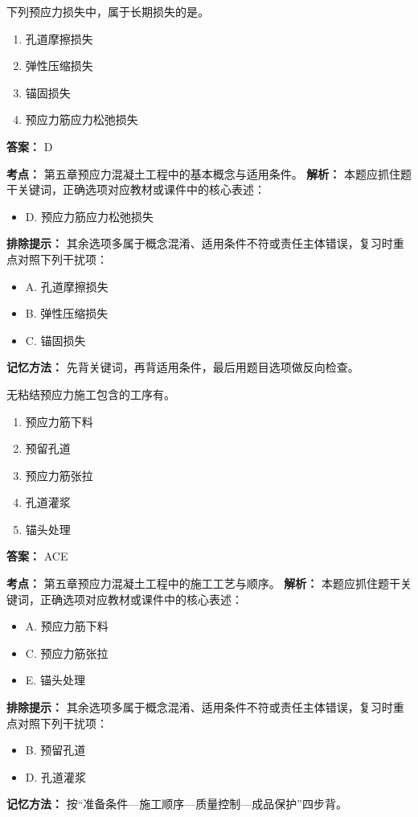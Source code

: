 \documentclass[UTF8,fontset=fandol,11pt]{ctexart}
\begin{document}
\begin{quizbox}[title={第 6 题}]
下列预应力损失中，属于长期损失的是。\\
\begin{enumerate}[label=\Alph*.]
\item 孔道摩擦损失
\item 弹性压缩损失
\item 锚固损失
\item 预应力筋应力松弛损失
\end{enumerate}
\textbf{答案：} D
\vspace{0.25em}
\begin{answerbox}[title={考点解析}]
\textbf{考点：} 第五章预应力混凝土工程中的基本概念与适用条件。
\textbf{解析：} 本题应抓住题干关键词，正确选项对应教材或课件中的核心表述：
\begin{itemize}
\item D. 预应力筋应力松弛损失
\end{itemize}
\textbf{排除提示：} 其余选项多属于概念混淆、适用条件不符或责任主体错误，复习时重点对照下列干扰项：
\begin{itemize}
\item A. 孔道摩擦损失
\item B. 弹性压缩损失
\item C. 锚固损失
\end{itemize}
\textbf{记忆方法：} 先背关键词，再背适用条件，最后用题目选项做反向检查。
\end{answerbox}
\end{quizbox}

\vspace{0.2em}

\begin{quizbox}[title={第 7 题}]
无粘结预应力施工包含的工序有。\\
\begin{enumerate}[label=\Alph*.]
\item 预应力筋下料
\item 预留孔道
\item 预应力筋张拉
\item 孔道灌浆
\item 锚头处理
\end{enumerate}
\textbf{答案：} ACE
\vspace{0.25em}
\begin{answerbox}[title={考点解析}]
\textbf{考点：} 第五章预应力混凝土工程中的施工工艺与顺序。
\textbf{解析：} 本题应抓住题干关键词，正确选项对应教材或课件中的核心表述：
\begin{itemize}
\item A. 预应力筋下料
\item C. 预应力筋张拉
\item E. 锚头处理
\end{itemize}
\textbf{排除提示：} 其余选项多属于概念混淆、适用条件不符或责任主体错误，复习时重点对照下列干扰项：
\begin{itemize}
\item B. 预留孔道
\item D. 孔道灌浆
\end{itemize}
\textbf{记忆方法：} 按“准备条件—施工顺序—质量控制—成品保护”四步背。
\end{answerbox}
\end{quizbox}
\end{document}

